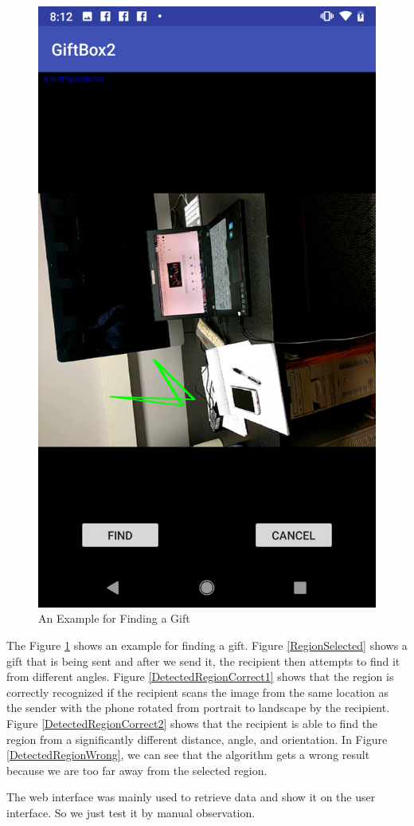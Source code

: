 \begin{figure}[htb]
\begin{minipage}[H]{0.3\textwidth}
\includegraphics[width=.95\textwidth]{section05/assets/resultExample1.png}
\subcaption{\label{DetectedRegionWrong}}
\end{minipage}%
\caption[An Example for finding a gift]{\label{AnExampleForFindingAGift}An Example for Finding a Gift}
\end{figure}

\par The Figure \ref{AnExampleForFindingAGift} shows an example for finding a gift. Figure \ref{RegionSelected} shows a gift that is being sent and after we send it, the recipient then attempts to find it from different angles. Figure \ref{DetectedRegionCorrect1} shows that the region is correctly recognized if the recipient scans the image from the same location as the sender with the phone rotated from portrait to landscape by the recipient. Figure \ref{DetectedRegionCorrect2} shows that the recipient is able to find the region from a significantly different distance, angle, and orientation. In Figure \ref{DetectedRegionWrong}, we can see that the algorithm gets a wrong result because we are too far away from the selected region. 
\par The web interface was mainly used to retrieve data and show it on the user interface. So we just test it by manual observation. 
